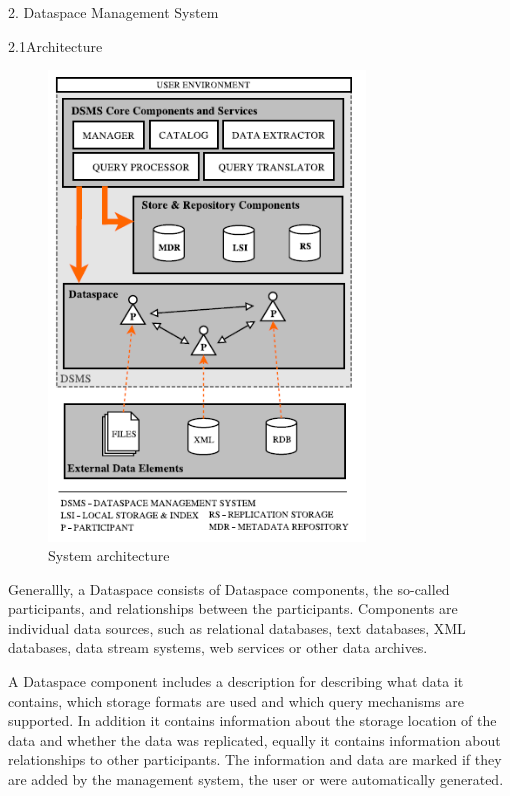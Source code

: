 2. Dataspace Management System 

2.1Architecture

\begin{figure}[H]
	\begin{center}
		\includegraphics[width=0.75\textwidth]{figures/TowardsRealizationOfDataspaces2.png}
	\end{center}
	\caption{System architecture}
	\label{labelToRef}
\end{figure}

Generallly, a Dataspace consists of Dataspace components, the so-called participants, and relationships between the participants. Components are individual data sources, such as relational databases, text databases, XML databases, data stream systems, web services or other data archives.

A Dataspace component includes a description for describing what data it contains, which storage formats are used and which query mechanisms are supported. In addition it contains information about the storage location of the data and whether the data was replicated, equally it contains information about relationships to other participants. The information and data are marked if they are added by the management system, the user or were automatically generated.  

